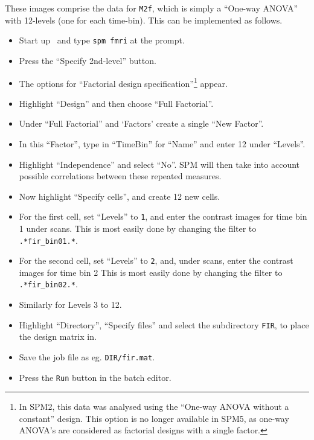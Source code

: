 These images comprise the data for \texttt{M2f}, which is simply a ``One-way ANOVA'' with 12-levels (one for each time-bin). This can be implemented as follows.
\begin{itemize}
\item Start up \matlab\ and type \texttt{spm fmri} at the prompt.
\item Press the ``Specify 2nd-level'' button.
\item The options for ``Factorial design specification''\footnote{In SPM2, this data was analysed using the ``One-way ANOVA without a constant'' design. This option is no longer available in SPM5, as one-way ANOVA's are considered as factorial designs with a single factor.} appear.
\item Highlight ``Design'' and then choose ``Full Factorial''.
\item Under ``Full Factorial'' and `Factors' create a single ``New Factor''.
\item In this ``Factor'', type in ``TimeBin'' for ``Name'' and enter 12 under ``Levels''.
\item Highlight ``Independence'' and select ``No''. SPM will then take into account possible correlations between these repeated measures.
\item Now highlight ``Specify cells'', and create 12 new cells.
\item For the first cell, set ``Levels'' to \texttt{1}, and enter the contrast images for time bin 1 under scans. This is most easily done by changing the filter to \texttt{.*fir\_bin01.*}.
\item For the second cell, set ``Levels'' to \texttt{2}, and, under scans, enter the contrast images for time bin 2 This is most easily done by changing the filter to \texttt{.*fir\_bin02.*}.
\item Similarly for Levels 3 to 12.
\item Highlight ``Directory'', ``Specify files'' and select the subdirectory \texttt{FIR}, to place the design matrix in.
\item Save the job file as eg. \texttt{DIR/fir.mat}.
\item Press the \texttt{Run} button in the batch editor.
\end{itemize}


